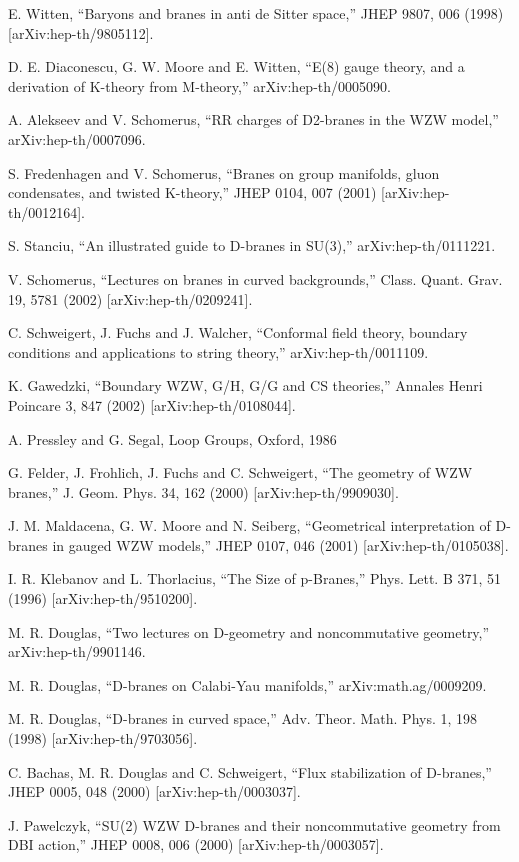 \documentclass[11pt,a4paper]{ctexart}
\begin{document}
\begin{enumerate}[label={[\arabic*]},leftmargin=*,itemsep=2pt]
\item E. Witten, “Baryons and branes in anti de Sitter space,” JHEP 9807, 006 (1998) [arXiv:hep-th/9805112].
\item D. E. Diaconescu, G. W. Moore and E. Witten, “E(8) gauge theory, and a derivation of K-theory from M-theory,” arXiv:hep-th/0005090.
\item A. Alekseev and V. Schomerus, “RR charges of D2-branes in the WZW model,” arXiv:hep-th/0007096.
\item S. Fredenhagen and V. Schomerus, “Branes on group manifolds, gluon condensates, and twisted K-theory,” JHEP 0104, 007 (2001) [arXiv:hep-th/0012164].
\item S. Stanciu, “An illustrated guide to D-branes in SU(3),” arXiv:hep-th/0111221.
\item V. Schomerus, “Lectures on branes in curved backgrounds,” Class. Quant. Grav. 19, 5781 (2002) [arXiv:hep-th/0209241].
\item C. Schweigert, J. Fuchs and J. Walcher, “Conformal field theory, boundary conditions and applications to string theory,” arXiv:hep-th/0011109.
\item K. Gawedzki, “Boundary WZW, G/H, G/G and CS theories,” Annales Henri Poincare 3, 847 (2002) [arXiv:hep-th/0108044].
\item A. Pressley and G. Segal, Loop Groups, Oxford, 1986
\item G. Felder, J. Frohlich, J. Fuchs and C. Schweigert, “The geometry of WZW branes,” J. Geom. Phys. 34, 162 (2000) [arXiv:hep-th/9909030].
\item J. M. Maldacena, G. W. Moore and N. Seiberg, “Geometrical interpretation of D- branes in gauged WZW models,” JHEP 0107, 046 (2001) [arXiv:hep-th/0105038].
\item I. R. Klebanov and L. Thorlacius, “The Size of p-Branes,” Phys. Lett. B 371, 51 (1996) [arXiv:hep-th/9510200].
\item M. R. Douglas, “Two lectures on D-geometry and noncommutative geometry,” arXiv:hep-th/9901146.
\item M. R. Douglas, “D-branes on Calabi-Yau manifolds,” arXiv:math.ag/0009209.
\item M. R. Douglas, “D-branes in curved space,” Adv. Theor. Math. Phys. 1, 198 (1998) [arXiv:hep-th/9703056].
\item C. Bachas, M. R. Douglas and C. Schweigert, “Flux stabilization of D-branes,” JHEP 0005, 048 (2000) [arXiv:hep-th/0003037].
\item J. Pawelczyk, “SU(2) WZW D-branes and their noncommutative geometry from DBI action,” JHEP 0008, 006 (2000) [arXiv:hep-th/0003057].

\end{enumerate}
\end{document}
